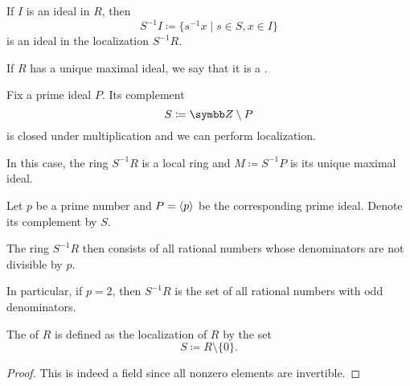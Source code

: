 \begin{proposition}\label{thm:ring_localization_preserves_ideals}\cite[432]{Knapp2016BAlg}
  If \( I \) is an ideal in \( R \), then
  \begin{equation*}
    S^{-1} I \coloneqq \{ s^{-1} x \mid s \in S, x \in I \}
  \end{equation*}
  is an ideal in the localization \( S^{-1} R \).
\end{proposition}

\begin{definition}\label{def:local_ring}
  If \( R \) has a unique maximal ideal, we say that it is a .
\end{definition}

\begin{proposition}\label{thm:localization_of_prime_is_local}\cite[corollary 8.50]{Knapp2016BAlg}
  Fix a prime ideal \( P \). Its complement
  \begin{equation*}
    S \coloneqq \BZ \setminus P
  \end{equation*}
  is closed under multiplication and we can perform localization.

  In this case, the ring \( S^{-1} R \) is a local ring and \( M \coloneqq S^{-1} P \) is its unique maximal ideal.
\end{proposition}

\begin{example}\label{ex:ring_localization}\cite[430]{Knapp2016BAlg}
  Let \( p \) be a prime number and \( P = \left\langle p \right\rangle \) be the corresponding prime ideal. Denote its complement by \( S \).

  The ring \( S^{-1} R \) then consists of all rational numbers whose denominators are not divisible by \( p \).

  In particular, if \( p = 2 \), then \( S^{-1} R \) is the set of all rational numbers with odd denominators.
\end{example}

\begin{definition}\label{def:field_of_fractions}
  The  of \( R \) is defined as the localization of \( R \) by the set
  \begin{equation*}
    S \coloneqq R \setminus \{ 0 \}.
  \end{equation*}
\end{definition}
\begin{proof}
  This is indeed a field since all nonzero elements are invertible.
\end{proof}
